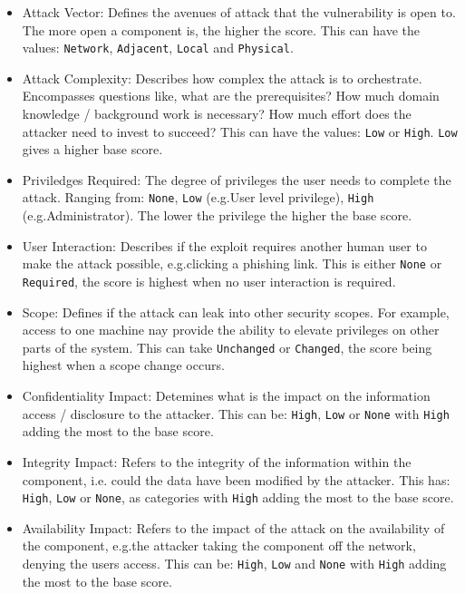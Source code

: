 \documentclass[12pt]{article}
\begin{document}
\begin{itemize}

	\item Attack Vector: Defines the avenues of attack that the vulnerability is open to. The more
	      open a component is, the higher the score. This can have the values: \texttt{Network},
	      \texttt{Adjacent}, \texttt{Local} and \texttt{Physical}.

	\item Attack Complexity: Describes how complex the attack is to orchestrate. Encompasses
	      questions like, what are the prerequisites? How much domain knowledge / background work is
	      necessary? How much effort does the attacker need to invest to succeed? This can have the
	      values: \texttt{Low} or \texttt{High}. \texttt{Low} gives a higher base score.

	\item Priviledges Required: The degree of privileges the user needs to complete the attack.
	      Ranging from: \texttt{None}, \texttt{Low} (e.g.\@ User level privilege), \texttt{High}
	      (e.g.\@ Administrator). The lower the privilege the higher the base score.

	\item User Interaction: Describes if the exploit requires another human user to make the attack
	      possible, e.g.\@ clicking a phishing link. This is either \texttt{None} or
	      \texttt{Required}, the score is highest when no user interaction is required.

	\item Scope: Defines if the attack can leak into other security scopes. For example, access to one
	      machine nay provide the ability to elevate privileges on other parts of the system. This can take
	      \texttt{Unchanged} or \texttt{Changed}, the score being highest when a scope change occurs.

	\item Confidentiality Impact: Detemines what is the impact on the information access /
	      disclosure to the attacker. This can be: \texttt{High}, \texttt{Low} or \texttt{None} with
	      \texttt{High} adding the most to the base score.

	\item Integrity Impact: Refers to the integrity of the information within the component, i.e.\@
	      could the data have been modified by the attacker. This has: \texttt{High}, \texttt{Low} or
	      \texttt{None}, as categories with \texttt{High} adding the most to the base score.

	\item Availability Impact: Refers to the impact of the attack on the availability of the
	      component, e.g.\@ the attacker taking the component off the network, denying the users
	      access. This can be: \texttt{High}, \texttt{Low} and \texttt{None} with \texttt{High} adding
	      the most to the base score.

\end{itemize}
\end{document}
